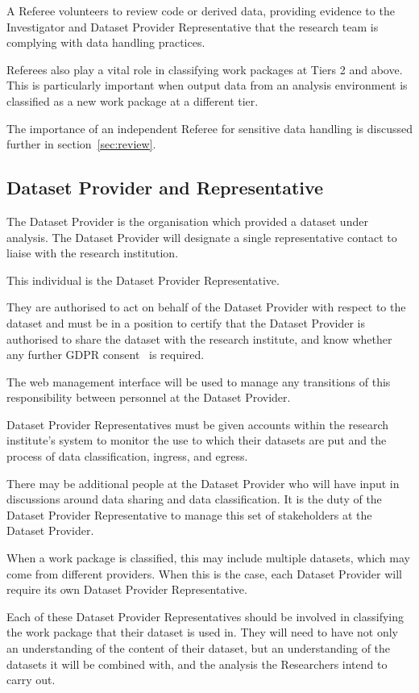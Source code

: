 \documentclass[10pt,a4paper,twocolumn]{article}
\begin{document}
A Referee volunteers to review code or derived data, providing evidence to the Investigator and Dataset Provider Representative that the research team is complying with data handling practices. 

Referees also play a vital role in classifying work packages at Tiers 2 and above. This is particularly important when output data from an analysis environment is classified as a new work package at a different tier.

The importance of an independent Referee for sensitive data handling is discussed further in section~\ref{sec:review}.

\subsection{Dataset Provider and Representative}

The Dataset Provider is the organisation which provided a dataset under analysis. The Dataset Provider will designate a single representative contact to liaise with the research institution.

This individual is the Dataset Provider Representative.

They are authorised to act on behalf of the Dataset Provider with respect to the dataset and must be in a position to certify that the Dataset Provider is authorised  to share the dataset with the research institute, and know whether any further GDPR consent~\cite{GDPR} is required.

The web management interface will be used to manage any transitions of this responsibility between personnel at the Dataset Provider.

Dataset Provider Representatives must be given accounts within the research institute's system to monitor the use to which their datasets
are put and the process of data classification, ingress, and egress.

There may be additional people at the Dataset Provider who will have input in discussions around data sharing and data classification.
It is the duty of the Dataset Provider Representative to manage this set of stakeholders at the Dataset Provider.

When a work package is classified, this may include multiple datasets, which may come from different providers. When this is the case, each Dataset Provider will require its own Dataset Provider Representative. 

Each of these Dataset Provider Representatives should be involved in classifying the work package that their dataset is used in. They will need to have not only an understanding of the content of their dataset, but an understanding of the datasets it will be combined with, and the analysis the Researchers intend to carry out. 
\end{document}
